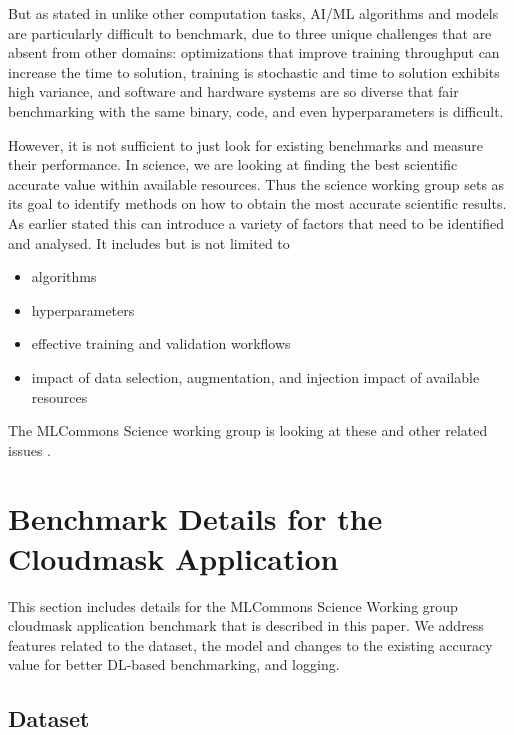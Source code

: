 \documentclass[sigplan,screen]{acmart}
\begin{document}
But as stated in \cite{arxiv-mlperf} unlike other computation tasks, AI/ML algorithms and models are particularly difficult to benchmark, due to three unique challenges that are absent from other domains: optimizations that improve training throughput can increase the time to solution, training is stochastic and time to solution exhibits high variance, and software and hardware systems are so diverse that fair benchmarking with the same binary, code, and even hyperparameters is difficult. 

However, it is not sufficient to just look for existing benchmarks and measure their performance. In science, we are looking at finding the best scientific accurate value within available resources. 
Thus the science working group sets as its goal to identify methods on how to obtain the most accurate scientific results.
As earlier stated this can introduce a variety of factors that need to be identified and analysed. It includes but is not limited to 

\begin{itemize}
    \item algorithms
    \item hyperparameters
    \item effective training and validation workflows
    \item impact of data selection, augmentation, and injection
    \itme impact of available resources
\end{itemize}

The MLCommons Science working group is looking at these and other related issues
\cite{mlcommons-benchmark-2023}.



\section{Benchmark Details for the Cloudmask Application}
\label{sec:bench-method}

This section includes details for the MLCommons Science Working group cloudmask application benchmark that is described in this paper. We address features related to the dataset, the model and changes to the existing accuracy value for better DL-based benchmarking, and logging. 

\subsection{Dataset}
\end{document}
